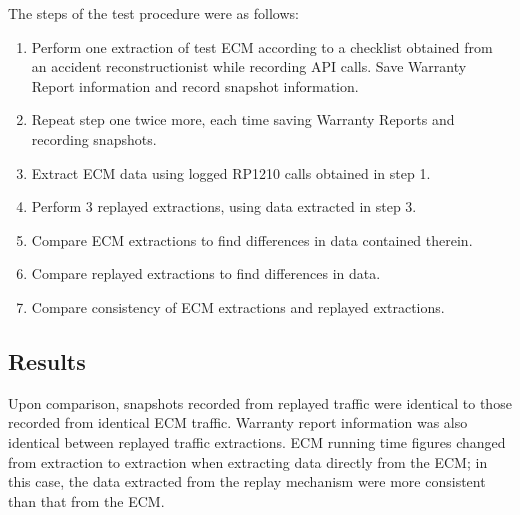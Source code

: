 The steps of the test procedure were as follows:

\begin{enumerate}
  \item Perform one extraction of test ECM according to a checklist obtained from an accident reconstructionist while recording API calls. Save Warranty Report information and record snapshot information.
  \item Repeat step one twice more, each time saving Warranty Reports and recording snapshots.
  \item Extract ECM data using logged RP1210 calls obtained in step 1.
  \item Perform 3 replayed extractions, using data extracted in step 3.
  \item Compare ECM extractions to find differences in data contained therein.
  \item Compare replayed extractions to find differences in data.
  \item Compare consistency of ECM extractions and replayed extractions.
\end{enumerate}

\subsection{Results}

Upon comparison, snapshots recorded from replayed traffic were identical to those recorded from identical ECM traffic. Warranty report information was also identical
between replayed traffic extractions. ECM running time figures changed from extraction to extraction when extracting data directly from the ECM; in this case, the
data extracted from the replay mechanism were more consistent than that from the ECM.


